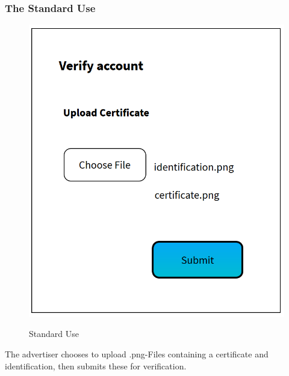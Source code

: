 \subsubsection{The Standard Use}

\begin{minipage}{0.5\textwidth}
\begin{figure}[H]
\centering
\includegraphics[scale=.8]{SystemSpec/Usecases/Mocks/reqVerNormal.png}\\
\caption{\label{fig:blue_rectangle}Standard Use}
\end{figure}
\end{minipage} \hfill
\begin{minipage}{0.5\textwidth}
The advertiser chooses to upload .png-Files containing a certificate and identification, then submits these for verification.
\end{minipage}

